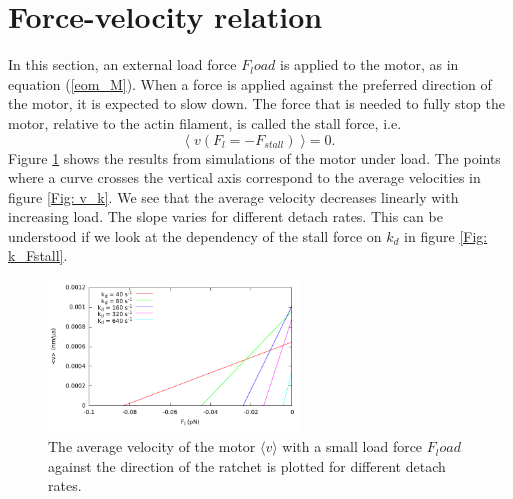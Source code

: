 \documentclass[aps,pre,onecolumn,showpacs,showkeys,a4paper]{revtex4}
\begin{document}
\section{Force-velocity relation}
In this section, an external load force $F_load$ is applied to the motor, as in equation (\ref{eom_M}). When a force is applied against the preferred direction of the motor, it is expected to slow down. The force that is needed to fully stop the motor, relative to the actin filament, is called the stall force, i.e. $$\langle\; v ( F_{l} = -F_{stall} )\; \rangle = 0 .$$Figure \ref{Fig: F_v_zoom}  shows the results from simulations of the motor under load. The points where a curve crosses the vertical axis correspond to the average velocities in figure \ref{Fig: v_k}. We see that the average velocity decreases linearly with increasing load. The slope varies for different detach rates. This can be understood if we look at the dependency of the stall force on $k_{d}$ in figure \ref{Fig: k_Fstall}.
\begin{figure}[h]
\centering
\includegraphics[width=0.6\textwidth,height=!]{F_v_zoom}
\caption{The average velocity of the motor $\langle v \rangle$ with a small load force $F_load$ against the direction of the ratchet is plotted for different detach rates.}
\label{Fig: F_v_zoom} 
\end{figure}
\end{document}

